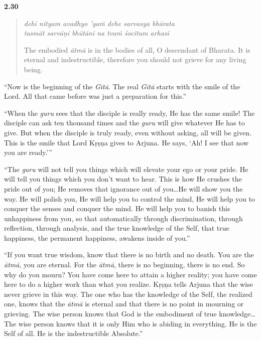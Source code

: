 \par\noindent\textbf{2.30}\par
\begin{verse}
\textit{dehī nityam avadhyo ’yaṁ dehe sarvasya bhārata} \\
\textit{tasmāt sarvāṇi bhūtāni na tvaṁ śocitum arhasi}

\noindent The embodied \textit{ātmā} is in the bodies of all, O descendant of Bharata. It is eternal and indestructible, therefore you should not grieve for any living being.
\end{verse}
\par


\enquote{Now is the beginning of the \textit{Gītā}. The real \textit{Gītā} starts with the smile of the Lord. All that came before was just a preparation for this.}

\enquote{When the \textit{guru} sees that the disciple is really ready, He has the same smile! The disciple can ask ten thousand times and the \textit{guru} will give whatever He has to give. But when the disciple is truly ready, even without asking, all will be given. This is the smile that Lord Kṛṣṇa gives to Arjuna. He says, \enquote{Ah! I see that now you are ready.}}

\enquote{The \textit{guru} will not tell you things which will elevate your ego or your pride. He will tell you things which you don’t want to hear. This is how He crushes the pride out of you; He removes that ignorance out of you\ldots He will show you the way. He will polish you, He will help you to control the mind, He will help you to conquer the senses and conquer the mind. He will help you to banish this unhappiness from you, so that automatically through discrimination, through reflection, through analysis, and the true knowledge of the Self, that true happiness, the permanent happiness, awakens inside of you.}

\enquote{If you want true wisdom, know that there is no birth and no death. You are the \textit{ātmā}, you are eternal. For the \textit{ātmā}, there is no beginning, there is no end. So why do you mourn? You have come here to attain a higher reality; you have come here to do a higher work than what you realize. Kṛṣṇa tells Arjuna that the wise never grieve in this way. The one who has the knowledge of the Self, the realized one, knows that the \textit{ātmā} is eternal and that there is no point in mourning or grieving. The wise person knows that God is the embodiment of true knowledge\ldots The wise person knows that it is only Him who is abiding in everything. He is the Self of all. He is the indestructible Absolute.}

